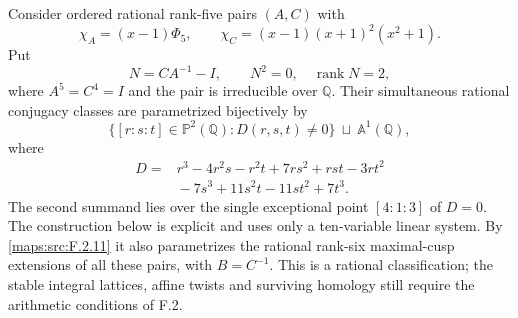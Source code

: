 \begin{theorem}\label{maps:src:F.2.20}


Consider ordered rational rank-five pairs $(A,C)$ with
\[
 \chi_A=(x-1)\Phi_5,
 \qquad \chi_C=(x-1)(x+1)^2(x^2+1).
\]
Put
\[
 N=CA^{-1}-I,
 \qquad N^2=0,\quad\operatorname{rank}N=2,
\]
where $A^5=C^4=I$ and the pair is irreducible over $\mathbb Q$.
Their simultaneous rational conjugacy classes are parametrized
bijectively by
\[
 \bigl\{[r:s:t]\in\mathbb P^2(\mathbb Q):D(r,s,t)\ne0\bigr\}
 \ \sqcup\ \mathbb A^1(\mathbb Q),
 \tag{F.R1}\label{maps:eq:F.R1}
\]
where
\[
\begin{split}
 D={}&r^3-4r^2s-r^2t+7rs^2+rst-3rt^2\\
     &{}-7s^3+11s^2t-11st^2+7t^3.
\end{split}
 \tag{F.R2}\label{maps:eq:F.R2}
\]
The second summand lies over the single exceptional point
$[4:1:3]$ of $D=0$.  The construction below is explicit and
uses only a ten-variable linear system.  By \ref{maps:src:F.2.11} it also
parametrizes the rational rank-six maximal-cusp extensions
of all these pairs, with $B=C^{-1}$.
This is a rational classification; the stable integral
lattices, affine twists and surviving homology still require
the arithmetic conditions of F.2.

\end{theorem}


